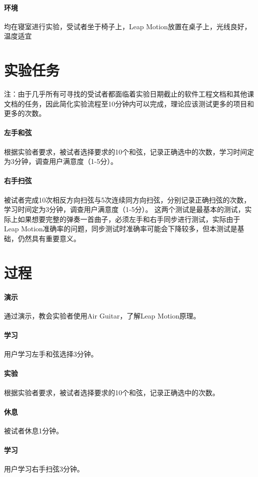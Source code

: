         \paragraph{环境} 均在寝室进行实验，受试者坐于椅子上，Leap Motion放置在桌子上，光线良好，温度适宜

    \section{实验任务}
        注：由于几乎所有可寻找的受试者都面临着实验日期截止的软件工程文档和其他课文档的任务，因此简化实验流程至10分钟内可以完成，理论应该测试更多的项目和更多的次数。
        \paragraph{左手和弦} 根据实验者要求，被试者选择要求的10个和弦，记录正确选中的次数，学习时间定为3分钟，调查用户满意度（1-5分）。
        \paragraph{右手扫弦} 被试者完成10次相反方向扫弦与5次连续同方向扫弦，分别记录正确扫弦的次数，学习时间定为3分钟，调查用户满意度（1-5分）。
        这两个测试是最基本的测试，实际上如果想要完整的弹奏一首曲子，必须左手和右手同步进行测试，实际由于Leap Motion准确率的问题，同步测试时准确率可能会下降较多，但本测试是基础，仍然具有重要意义。

    \section{过程}
        \paragraph{演示} 通过演示，教会实验者使用Air Guitar，了解Leap Motion原理。
        \paragraph{学习} 用户学习左手和弦选择3分钟。
        \paragraph{实验} 根据实验者要求，被试者选择要求的10个和弦，记录正确选中的次数。
        \paragraph{休息} 被试者休息1分钟。
        \paragraph{学习} 用户学习右手扫弦3分钟。

